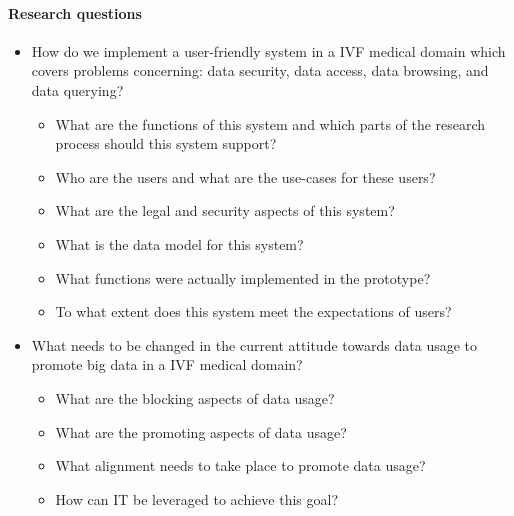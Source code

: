 \paragraph{Research questions}
\begin{itemize}
	\item How do we implement a user-friendly system in a IVF medical domain which covers problems concerning: data security, data access, data browsing, and data querying?
	\begin{itemize}
		\item What are the functions of this system and which parts of the research process should this system support?
		\item Who are the users and what are the use-cases for these users?
		\item What are the legal and security aspects of this system?
		\item What is the data model for this system?
		\item What functions were actually implemented in the prototype?
		\item To what extent does this system meet the expectations of users?
	\end{itemize}
	\item What needs to be changed in the current attitude towards data usage to promote big data in a IVF medical domain?
	\begin{itemize}
		\item What are the blocking aspects of data usage?
		\item What are the promoting aspects of data usage?
		\item What alignment needs to take place to promote data usage?
		\item How can IT be leveraged to achieve this goal?
	\end{itemize}
\end{itemize}



